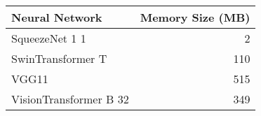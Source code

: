 \begin{tabular}{lr}
\toprule
Neural Network & Memory Size (MB) \\
\midrule
SqueezeNet 1 1 & 2 \\
SwinTransformer T & 110 \\
VGG11 & 515 \\
VisionTransformer B 32 & 349 \\
\bottomrule
\end{tabular}
